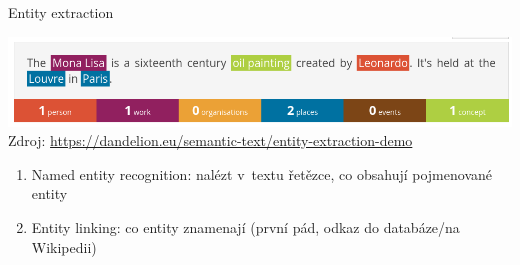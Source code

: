 \documentclass[aspectratio=169,dvipsnames]{beamer}
\begin{document}
\begin{frame}{Entity extraction}

    \includegraphics[scale=.4]{./img/mona_lisa.png} \\
    {\tiny Zdroj: \url{https://dandelion.eu/semantic-text/entity-extraction-demo}}

    \vspace{10pt}

    \begin{enumerate}

        \item<3-> Named entity recognition: nalézt v~textu řetězce, co obsahují
            pojmenované entity

        \item<4-> Entity linking: co entity znamenají (první pád, odkaz do
            databáze/na Wikipedii)

    \end{enumerate}

\end{frame}

\end{document}
